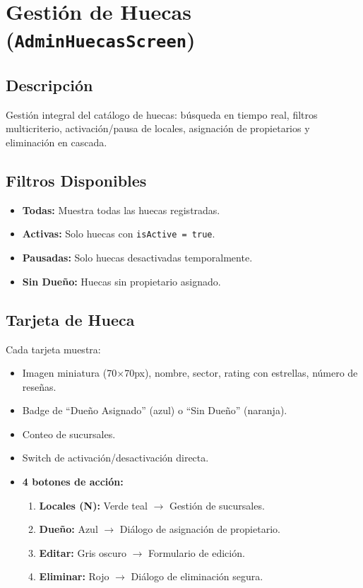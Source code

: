 \documentclass[11pt, a4paper, oneside]{report}
\begin{document}
\section{Gestión de Huecas (\texttt{AdminHuecasScreen})}

\subsection{Descripción}
Gestión integral del catálogo de huecas: búsqueda en tiempo real, filtros multicriterio, activación/pausa de locales, asignación de propietarios y eliminación en cascada.

\subsection{Filtros Disponibles}
\begin{itemize}
  \item \textbf{Todas:} Muestra todas las huecas registradas.
  \item \textbf{Activas:} Solo huecas con \texttt{isActive = true}.
  \item \textbf{Pausadas:} Solo huecas desactivadas temporalmente.
  \item \textbf{Sin Dueño:} Huecas sin propietario asignado.
\end{itemize}

\subsection{Tarjeta de Hueca}
Cada tarjeta muestra:
\begin{itemize}
  \item Imagen miniatura (70$\times$70px), nombre, sector, rating con estrellas, número de reseñas.
  \item Badge de ``Dueño Asignado'' (azul) o ``Sin Dueño'' (naranja).
  \item Conteo de sucursales.
  \item Switch de activación/desactivación directa.
  \item \textbf{4 botones de acción:}
  \begin{enumerate}
    \item \textbf{Locales (N):} Verde teal $\rightarrow$ Gestión de sucursales.
    \item \textbf{Dueño:} Azul $\rightarrow$ Diálogo de asignación de propietario.
    \item \textbf{Editar:} Gris oscuro $\rightarrow$ Formulario de edición.
    \item \textbf{Eliminar:} Rojo $\rightarrow$ Diálogo de eliminación segura.
  \end{enumerate}
\end{itemize}
\end{document}
